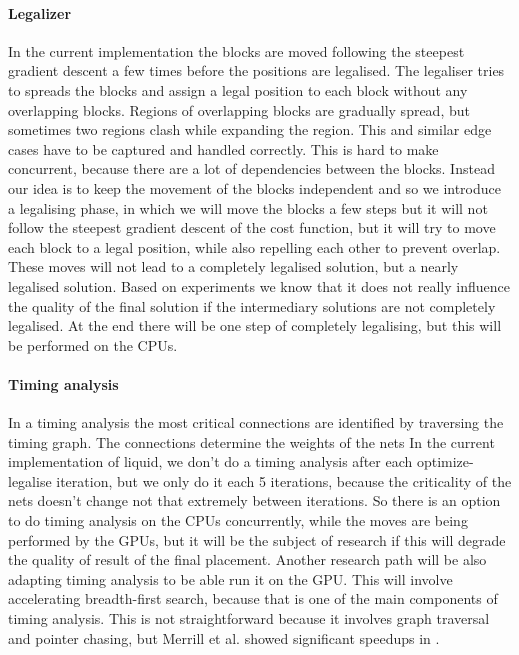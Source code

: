 \documentclass[a4paper,oneside,12pt]{article}
\begin{document}

\paragraph{Legalizer}
In the current implementation the blocks are moved following the steepest gradient descent a few times before the positions are legalised. The legaliser tries to spreads the blocks and assign a legal position to each block without any overlapping blocks. Regions of overlapping blocks are gradually spread, but sometimes two regions clash while expanding the region. This and similar edge cases have to be captured and handled correctly. This is hard to make concurrent, because there are a lot of dependencies between the blocks. 
Instead our idea is to keep the movement of the blocks independent and so we introduce a legalising phase, in which we will move the blocks a few steps but it will not follow the steepest gradient descent of the cost function, but it will try to move each block to a legal position, while also repelling each other to prevent overlap. These moves will not lead to a completely legalised solution, but a nearly legalised solution. Based on experiments we know that it does not really influence the quality of the final solution if the intermediary solutions are not completely legalised.  At the end there will be one step of completely legalising, but this will be performed on the CPUs.

\paragraph{Timing analysis}
In a timing analysis the most critical connections are identified by traversing the timing graph. The connections determine the weights of the nets
In the current implementation of liquid, we don't do a timing analysis after each optimize-legalise iteration, but we only do it each 5 iterations, because the criticality of the nets doesn't change not that extremely between iterations. 
So there is an option to do timing analysis on the CPUs concurrently, while the moves are being performed by the GPUs, but it will be the subject of research if this will degrade the quality of result of the final placement.
Another research path will be also adapting timing analysis to be able run it on the GPU. This will involve accelerating breadth-first search, because that is one of the main components of timing analysis. This is not straightforward because it involves graph traversal and pointer chasing, but Merrill et al. showed significant speedups in \cite{Merrill2015}.
\end{document}

